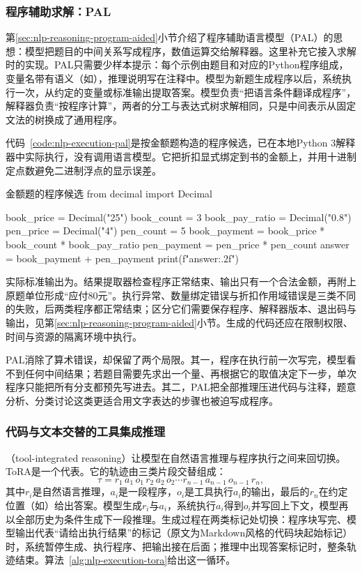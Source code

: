 \subsubsection{程序辅助求解：PAL}
\label{sec:nlp-execution-pal}

第\ref{sec:nlp-reasoning-program-aided}小节介绍了程序辅助语言模型（PAL）的思想：模型把题目的中间关系写成程序，数值运算交给解释器。这里补充它接入求解时的实现。PAL只需要少样本提示：每个示例由题目和对应的Python程序组成，变量名带有语义（如），推理说明写在注释中。模型为新题生成程序以后，系统执行一次，从约定的变量或标准输出提取答案。模型负责“把语言条件翻译成程序”，解释器负责“按程序计算”，两者的分工与表达式树求解相同，只是中间表示从固定文法的树换成了通用程序。

代码~\ref{code:nlp-execution-pal}是按金额题构造的程序候选，已在本地Python 3解释器中实际执行，没有调用语言模型。它把折扣显式绑定到书的金额上，并用十进制定点数避免二进制浮点的显示误差。

\begin{codeblock}[language=Python,label={code:nlp-execution-pal}]{金额题的程序候选}
from decimal import Decimal

book_price = Decimal("25")
book_count = 3
book_pay_ratio = Decimal("0.8")
pen_price = Decimal("4")
pen_count = 5
book_payment = book_price * book_count * book_pay_ratio
pen_payment = pen_price * pen_count
answer = book_payment + pen_payment
print(f"{answer:.2f}")
\end{codeblock}

实际标准输出为。结果提取器检查程序正常结束、输出只有一个合法金额，再附上原题单位形成“应付80元”。执行异常、数量绑定错误与折扣作用域错误是三类不同的失败，后两类程序都正常结束；区分它们需要保存程序、解释器版本、退出码与输出，见第\ref{sec:nlp-reasoning-program-aided}小节。生成的代码还应在限制权限、时间与资源的隔离环境中执行。

PAL消除了算术错误，却保留了两个局限。其一，程序在执行前一次写完，模型看不到任何中间结果；若题目需要先求出一个量、再根据它的取值决定下一步，单次程序只能把所有分支都预先写进去。其二，PAL把全部推理压进代码与注释，题意分析、分类讨论这类更适合用文字表达的步骤也被迫写成程序。

\subsubsection{代码与文本交替的工具集成推理}
\label{sec:nlp-execution-tora}

（tool-integrated reasoning）让模型在自然语言推理与程序执行之间来回切换。ToRA是一个代表。它的轨迹由三类片段交替组成：
\[
  \tau=r_1\,a_1\,o_1\,r_2\,a_2\,o_2\cdots r_{n-1}\,a_{n-1}\,o_{n-1}\,r_n,
\]
其中$r_i$是自然语言推理，$a_i$是一段程序，$o_i$是工具执行$a_i$的输出，最后的$r_n$在约定位置（如）给出答案。模型生成$r_i$与$a_i$，系统执行$a_i$得到$o_i$并写回上下文，模型再以全部历史为条件生成下一段推理。生成过程在两类标记处切换：程序块写完、模型输出代表“请给出执行结果”的标记（原文为Markdown风格的代码块起始标记）时，系统暂停生成、执行程序、把输出接在后面；推理中出现答案标记时，整条轨迹结束。算法~\ref{alg:nlp-execution-tora}给出这一循环。

